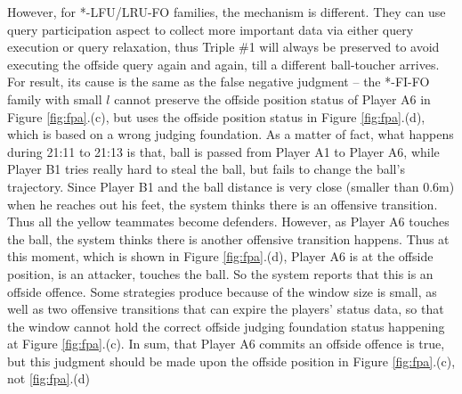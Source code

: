 However, for *-LFU/LRU-FO families, the mechanism is different. 
They can use query participation aspect to collect more important data via either query execution or query relaxation, thus Triple \#1 will always be preserved to avoid executing the offside query again and again, till a different ball-toucher arrives.
For \textcolor{red}{\fullmoon} result, its cause is the same as the false negative judgment -- the *-FI-FO family with small $l$ cannot preserve the offside position status of Player A6 in Figure \ref{fig:fpa}.(c), but uses the offside position status in Figure \ref{fig:fpa}.(d), which is based on a wrong judging foundation.
As a matter of fact, what happens during 21:11 to 21:13 is that, ball is passed from Player A1 to Player A6, while Player B1 tries really hard to steal the ball, but fails to change the ball's trajectory. 
Since Player B1 and the ball distance is very close (smaller than 0.6m) when he reaches out his feet, the system thinks there is an offensive transition. 
Thus all the yellow teammates become defenders. 
However, as Player A6 touches the ball, the system thinks there is another offensive transition happens. 
Thus at this moment, which is shown in Figure \ref{fig:fpa}.(d), Player A6 is at the offside position, is an attacker, touches the ball. 
So the system reports that this is an offside offence. 
Some strategies produce \textcolor{red}{\fullmoon} because of the window size is small, as well as two offensive transitions that can expire the players' status data, so that the window cannot hold the correct offside judging foundation status happening at Figure \ref{fig:fpa}.(c). 
In sum, that Player A6 commits an offside offence is true, but this judgment should be made upon the offside position in Figure \ref{fig:fpa}.(c), not \ref{fig:fpa}.(d)

